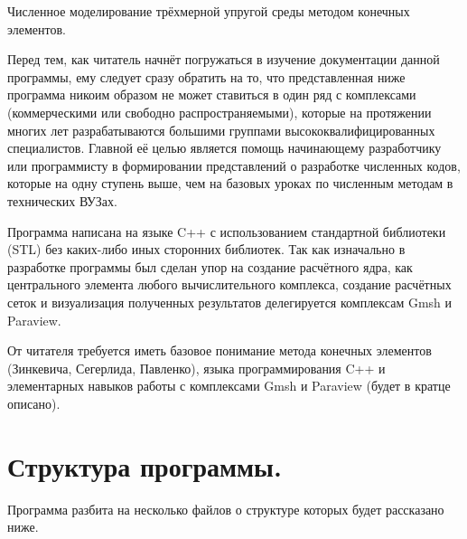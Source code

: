\documentclass[a4paper,12pt]{article}
\begin{document}
\begin{center}
\LARGE Численное моделирование трёхмерной упругой среды методом конечных элементов. 
\end{center}
	
	Перед тем, как читатель начнёт погружаться в изучение документации данной программы, ему следует сразу обратить на то, что представленная ниже программа никоим образом не может ставиться в один ряд с комплексами (коммерческими или свободно распространяемыми), которые на протяжении многих лет разрабатываются большими группами высококвалифицированных специалистов. Главной её целью является помощь начинающему разработчику или программисту в формировании представлений о разработке численных кодов, которые на одну ступень выше, чем на базовых уроках по численным методам в технических ВУЗах. 
  	
	
	Программа написана на языке C++ с использованием стандартной библиотеки (STL) без каких-либо иных сторонних библиотек. Так как изначально в разработке программы был сделан упор на создание расчётного ядра, как центрального элемента любого вычислительного комплекса, создание расчётных сеток и визуализация полученных результатов делегируется комплексам Gmsh и Paraview.

	От читателя требуется иметь базовое понимание метода конечных элементов (Зинкевича, Сегерлида, Павленко), языка программирования C++ и элементарных навыков работы с комплексами Gmsh и Paraview (будет в кратце описано).  

\section{Структура программы.}
	
	Программа разбита на несколько файлов о структуре которых будет рассказано ниже.
\end{document}
